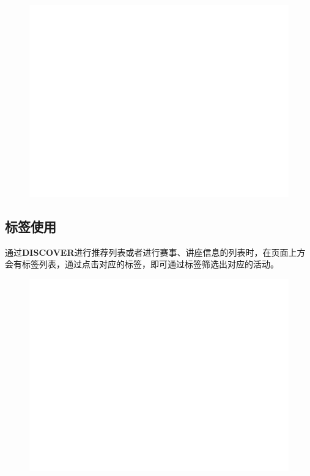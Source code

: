 \documentclass[UTF8]{ctexart}
\begin{document}
\begin{figure}[h]
    \centering
    \includegraphics[width=\textwidth]{manual_images//temp.png}
\end{figure}

\newpage
\subsection{标签使用}

通过{\bfseries DISCOVER}进行推荐列表或者进行赛事、讲座信息的列表时，在页面上方会有标签列表，通过点击对应的标签，即可通过标签筛选出对应的活动。

\begin{figure}[h]
    \centering
    \includegraphics[width=\textwidth]{manual_images//temp.png}
\end{figure}
\end{document}
